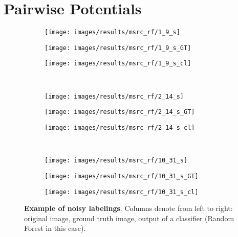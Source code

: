 \section{Pairwise Potentials}
\begin{figure}[t]
 \centering
 \begin{subfigure}[c]{0.24\textwidth}
  \centering
  \texttt{[image: images/results/msrc\_rf/1\_9\_s]}
 \end{subfigure}
 \begin{subfigure}[c]{0.24\textwidth}
  \centering
  \texttt{[image: images/results/msrc\_rf/1\_9\_s\_GT]}
 \end{subfigure}
 \begin{subfigure}[c]{0.24\textwidth}
  \centering
  \texttt{[image: images/results/msrc\_rf/1\_9\_s\_cl]}
 \end{subfigure}
 \\
 \begin{subfigure}[c]{0.24\textwidth}
  \centering
  \texttt{[image: images/results/msrc\_rf/2\_14\_s]}
 \end{subfigure}
 \begin{subfigure}[c]{0.24\textwidth}
  \centering
  \texttt{[image: images/results/msrc\_rf/2\_14\_s\_GT]}
 \end{subfigure}
 \begin{subfigure}[c]{0.24\textwidth}
  \centering
  \texttt{[image: images/results/msrc\_rf/2\_14\_s\_cl]}
 \end{subfigure}
 \\
 \begin{subfigure}[c]{0.24\textwidth}
  \centering
  \texttt{[image: images/results/msrc\_rf/10\_31\_s]}
 \end{subfigure}
 \begin{subfigure}[c]{0.24\textwidth}
  \centering
  \texttt{[image: images/results/msrc\_rf/10\_31\_s\_GT]}
 \end{subfigure}
 \begin{subfigure}[c]{0.24\textwidth}
  \centering
  \texttt{[image: images/results/msrc\_rf/10\_31\_s\_cl]}
 \end{subfigure}
 \caption[Example of noisy labelings]{{\bf Example of noisy labelings}.
 Columns denote from left to right: original image, ground truth image, output of a classifier (Random Forest in this case).}
 \label{fig:noisy_example}
\end{figure}

